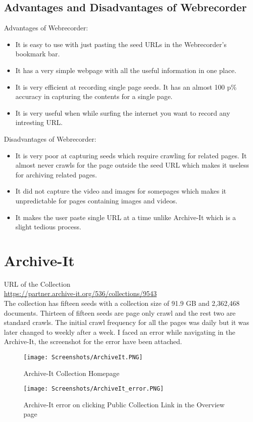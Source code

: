 \documentclass[11pt,journal,compsoc,onecolumn]{IEEEtran}
\begin{document}
\subsection{Advantages and Disadvantages of Webrecorder}
Advantages of Webrecorder:
\begin{itemize}
\item It is easy to use with just pasting the seed URLs in the Webrecorder's bookmark bar.
\item It has a very simple webpage with all the useful information in one place.
\item It is very efficient at recording single page seeds. It has an almost 100 p\% accuracy in capturing the contents for a single page.
\item It is very useful when while surfing the internet you want to record any intresting URL.
\end{itemize}
Disadvantages of Webrecorder:
\begin{itemize}
\item It is very poor at capturing seeds which require crawling for related pages. It almost never crawls for the page outside the seed URL which makes it useless for archiving related pages.
\item It did not capture the video and images for somepages which makes it unpredictable for pages containing images and videos.
\item It makes the user paste single URL at a time unlike Archive-It which is a slight tedious process.
\end{itemize}
\section{Archive-It}
URL of the Collection\\
\url{https://partner.archive-it.org/536/collections/9543}\\
The collection has fifteen seeds with a collection size of 91.9 GB and 2,362,468 documents. Thirteen of fifteen seeds are page only crawl and the rest two are standard crawls. The initial crawl frequency for all the pages was daily but it was later changed to weekly after a week. I faced an error while navigating in the Archive-It, the screenshot for the error have been attached.
\begin{figure}[ht] 
  \centering
  \texttt{[image: Screenshots/ArchiveIt.PNG]}
  \caption{Archive-It Collection Homepage}
  \label{fig:20}
\end{figure}
 \begin{figure}[ht] 
  \centering
  \texttt{[image: Screenshots/ArchiveIt\_error.PNG]}
  \caption{Archive-It error on clicking Public Collection Link in the Overview page}
  \label{fig:21}
\end{figure}
\end{document}
